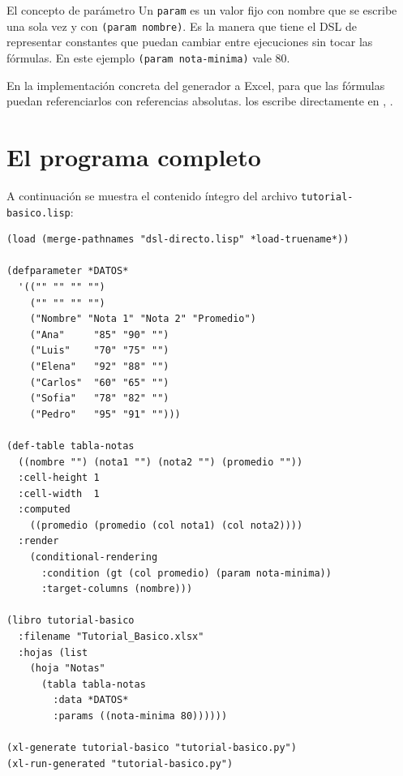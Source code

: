 \documentclass[12pt,a4paper]{report}
\begin{document}

\begin{infobox}{El concepto de parámetro}
  Un \texttt{param} es un valor fijo con nombre que se escribe una sola
  vez y  con \texttt{(param
  nombre)}.  Es la manera que tiene el DSL de representar constantes
  que puedan cambiar entre ejecuciones sin tocar las fórmulas.  En este
  ejemplo \texttt{(param nota-minima)} vale 80.

  En la implementación concreta del generador a Excel,  para que las fórmulas puedan
  referenciarlos con referencias absolutas.   los
  escribe directamente en , .
\end{infobox}



\section{El programa completo}

A continuación se muestra el contenido íntegro del archivo
\texttt{tutorial-basico.lisp}:

\begin{lstlisting}[caption={tutorial-basico.lisp --- programa completo.}]
(load (merge-pathnames "dsl-directo.lisp" *load-truename*))

(defparameter *DATOS*
  '(("" "" "" "")
    ("" "" "" "")
    ("Nombre" "Nota 1" "Nota 2" "Promedio")
    ("Ana"     "85" "90" "")
    ("Luis"    "70" "75" "")
    ("Elena"   "92" "88" "")
    ("Carlos"  "60" "65" "")
    ("Sofia"   "78" "82" "")
    ("Pedro"   "95" "91" "")))

(def-table tabla-notas
  ((nombre "") (nota1 "") (nota2 "") (promedio ""))
  :cell-height 1
  :cell-width  1
  :computed
    ((promedio (promedio (col nota1) (col nota2))))
  :render
    (conditional-rendering
      :condition (gt (col promedio) (param nota-minima))
      :target-columns (nombre)))

(libro tutorial-basico
  :filename "Tutorial_Basico.xlsx"
  :hojas (list
    (hoja "Notas"
      (tabla tabla-notas
        :data *DATOS*
        :params ((nota-minima 80))))))

(xl-generate tutorial-basico "tutorial-basico.py")
(xl-run-generated "tutorial-basico.py")
\end{lstlisting}
\end{document}
